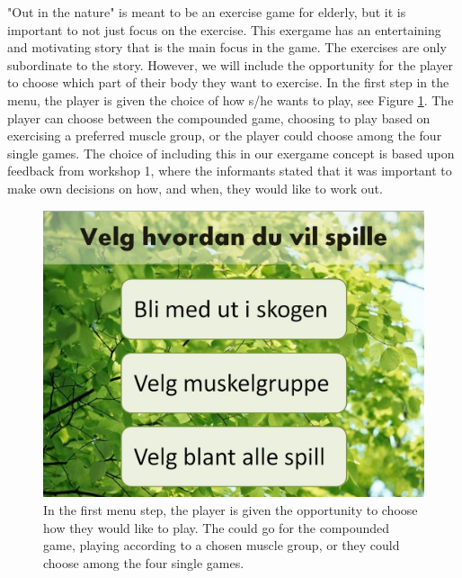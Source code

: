 "Out in the nature" is meant to be an exercise game for elderly, but it is important to not just focus on the exercise. This exergame has an entertaining and motivating story that is the main focus in the game. The exercises are only subordinate to the story. However, we will include the opportunity for the player to choose which part of their body they want to exercise. In the first step in the menu, the player is given the choice of how s/he wants to play, see Figure \ref{fig:menuStart}. The player can choose between the compounded game, choosing to play based on exercising a preferred muscle group, or the player could choose among the four single games. The choice of including this in our exergame concept is based upon feedback from workshop 1, where the informants stated that it was important to make own decisions on how, and when, they would like to work out.                     

\begin{figure} [H]
\centering
\includegraphics[scale=0.45]{menuStart.jpg}
\caption[The menu - start]{In the first menu step, the player is given the opportunity to choose how they would like to play. The could go for the compounded game, playing according to a chosen muscle group, or they could choose among the four single games.}
\label{fig:menuStart}
\end{figure} 

